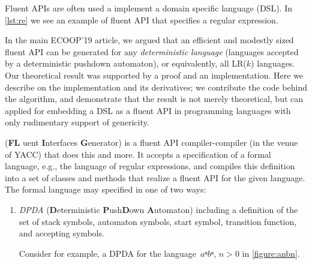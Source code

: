 \documentclass[a4paper,UKenglish,cleveref, autoref]{darts-v2019}
\begin{document}
\begin{scope}
Fluent APIs are often used a implement a domain specific language (DSL). In
\cref{lst:re} we see an example of fluent API that specifies
a regular expression.
In the main ECOOP'19 article, we argued that an efficient and modestly sized
fluent API can be generated for any \emph{deterministic language} (languages
accepted by a deterministic pushdown automaton), or equivalently, all LR($k$)
languages. Our theoretical result
was supported by a proof and an implementation. Here we describe
on the implementation and its derivatives; we contribute the code
behind the algorithm, and demonstrate that the result is not merely
theoretical, but can applied for embedding a DSL as a fluent API
in programming languages with only rudimentary support of genericity.

\Fling (\textbf F\textbf L uent \textbf Interfaces \textbf Generator) is a
fluent API compiler-compiler (in the venue of YACC) that does this and more.
It accepts a specification of a formal language, e.g., the language of
regular expressions,
and compiles this definition into a set of classes and methods that
realize a fluent API for the given language. The formal language may specified in one of two ways:
\begin{enumerate}
  \item \emph{DPDA} (\textbf Deterministic \textbf Push\textbf Down \textbf
    Automaton) including a definition of the set of stack symbols, automaton
    symbols, start symbol, transition function, and accepting symbols.

    Consider for example, a DPDA for the language~$aⁿbⁿ$, $n>0$ in \cref{figure:anbn}. 


\end{enumerate}
\end{scope}
\end{document}
